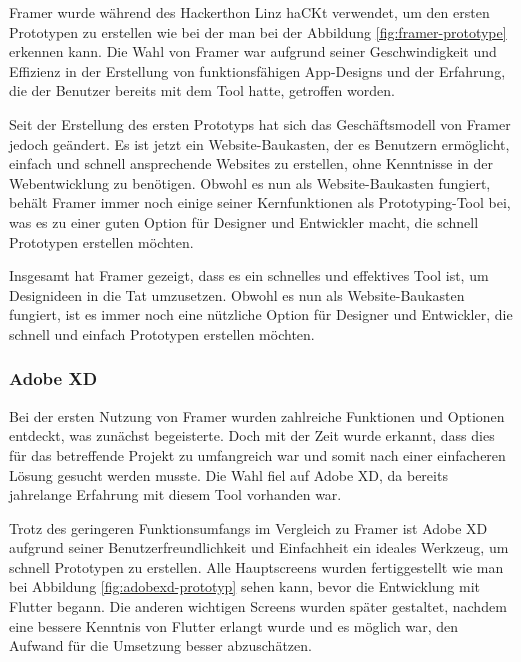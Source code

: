 Framer wurde während des Hackerthon Linz haCKt verwendet, um
den ersten Prototypen zu erstellen wie bei der man bei der
Abbildung \ref{fig:framer-prototype} erkennen kann. Die Wahl von Framer war
aufgrund seiner Geschwindigkeit und Effizienz in der
Erstellung von funktionsfähigen App-Designs und der
Erfahrung, die der Benutzer bereits mit dem Tool hatte,
getroffen worden.

Seit der Erstellung des ersten Prototyps hat sich das Geschäftsmodell von Framer jedoch geändert. Es ist jetzt ein Website-Baukasten, der es Benutzern ermöglicht, einfach und schnell ansprechende Websites zu erstellen, ohne Kenntnisse in der Webentwicklung zu benötigen. Obwohl es nun als Website-Baukasten fungiert, behält Framer immer noch einige seiner Kernfunktionen als Prototyping-Tool bei, was es zu einer guten Option für Designer und Entwickler macht, die schnell Prototypen erstellen möchten.

Insgesamt hat Framer gezeigt, dass es ein schnelles und effektives Tool ist, um Designideen in die Tat umzusetzen. Obwohl es nun als Website-Baukasten fungiert, ist es immer noch eine nützliche Option für Designer und Entwickler, die schnell und einfach Prototypen erstellen möchten.

\subsubsection{Adobe XD}
Bei der ersten Nutzung von Framer wurden zahlreiche Funktionen und Optionen entdeckt, was zunächst begeisterte. Doch mit der Zeit wurde erkannt, dass dies für das betreffende Projekt zu umfangreich war und somit nach einer einfacheren Lösung gesucht werden musste. Die Wahl fiel auf Adobe XD, da bereits jahrelange Erfahrung mit diesem Tool vorhanden war.

Trotz des geringeren Funktionsumfangs im Vergleich zu Framer
ist Adobe XD aufgrund seiner Benutzerfreundlichkeit und
Einfachheit ein ideales Werkzeug, um schnell Prototypen zu
erstellen. Alle Hauptscreens wurden fertiggestellt wie man
bei Abbildung \ref{fig:adobexd-prototyp} sehen kann, bevor
die Entwicklung mit Flutter begann. Die anderen wichtigen
Screens wurden später gestaltet, nachdem eine bessere
Kenntnis von Flutter erlangt wurde und es möglich war, den
Aufwand für die Umsetzung besser abzuschätzen.

